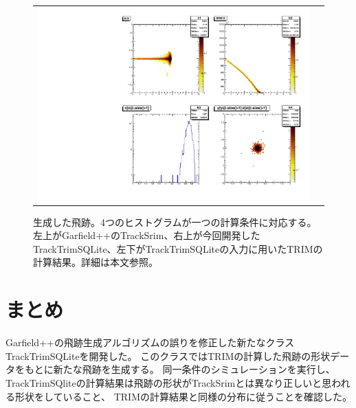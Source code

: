 \documentclass [11pt,a4paper,dvipdfmx] {jarticle}
\begin{document}
\begin{figure}[H]
\begin{center}
\begin{tabular}{c c}
\begin{minipage}{0.45\linewidth}
            \begin{center}
            \includegraphics[width=\linewidth]{./pic/trim_raw.pdf}
            \end{center}
        \end{minipage}
    \end{tabular}
\end{center}
    \caption{生成した飛跡。4つのヒストグラムが一つの計算条件に対応する。左上がGarfield++のTrackSrim、右上が今回開発したTrackTrimSQLite、左下がTrackTrimSQLiteの入力に用いたTRIMの計算結果。詳細は本文参照。}
    \label{fig:reflectivity}
\end{figure}




\section{まとめ}
Garfield++の飛跡生成アルゴリズムの誤りを修正した新たなクラスTrackTrimSQLiteを開発した。
このクラスではTRIMの計算した飛跡の形状データをもとに新たな飛跡を生成する。
同一条件のシミュレーションを実行し、
TrackTrimSQliteの計算結果は飛跡の形状がTrackSrimとは異なり正しいと思われる形状をしていること、
TRIMの計算結果と同様の分布に従うことを確認した。

% 

\newpage

\appendix
\end{document}
